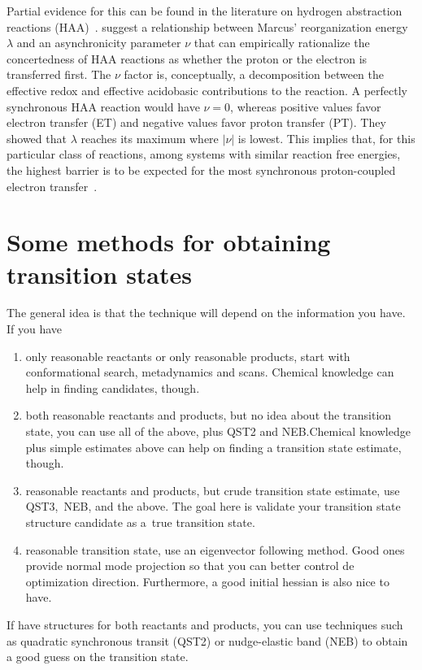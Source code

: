 Partial evidence for this can be found in the literature on hydrogen
abstraction reactions (HAA)~\cite{Bim2018}.
\citeauthor{Bim2018} suggest a relationship between Marcus' reorganization
energy $\lambda$ and an asynchronicity parameter $\nu$ that can empirically
rationalize the concertedness of HAA reactions as whether the proton or the
electron is transferred first.
The $\nu$ factor is, conceptually, a decomposition between the effective redox
and effective acidobasic contributions to the reaction.
A perfectly synchronous HAA reaction would have $\nu = 0$, whereas positive
values favor electron transfer (ET) and negative values favor proton transfer
(PT).
They showed that $\lambda$ reaches its maximum where $|\nu|$ is lowest.
This implies that, for this particular class of reactions, among systems with
similar reaction free energies, the highest barrier is to be expected for the
most synchronous proton-coupled electron transfer~\cite{Bim2018}.

\section{Some methods for obtaining transition states}

The general idea is that the technique will depend on the information you have.
If you have
\begin{enumerate}
	\item only reasonable reactants or only reasonable products, start with conformational search,
	      metadynamics and scans. Chemical knowledge can help in finding candidates,
	      though.
	\item both reasonable reactants and products, but no idea about the transition state, you can use
	      all of the above, plus QST2 and NEB.\@ Chemical knowledge plus simple estimates
	      above can help on finding a transition state estimate, though.
	\item reasonable reactants and products, but crude transition state
	      estimate, use QST3,\ NEB, and the above. The
	      goal here is validate your transition state structure candidate as
	      a~true transition state.
	\item reasonable transition state, use an eigenvector following method. Good ones
	      provide normal mode projection so that you can better control de optimization
	      direction. Furthermore, a good initial hessian is also nice to have.
\end{enumerate}

If have structures for both reactants and products, you can use techniques such
as quadratic synchronous transit (QST2) or nudge-elastic band (NEB) to obtain a
good guess on the transition state.

